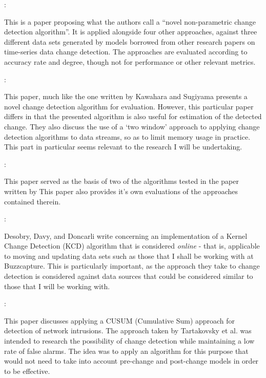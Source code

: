 \documentclass{uvamscse}
\begin{document}
\noindent\cite{kawahara2009change}: \textbf{}\smallskip

\noindent This is a paper proposing what the authors call a ``novel non-parametric change detection algorithm''\cite{kawahara2009change}. It is applied alongside four other approaches, against three different data sets generated by models borrowed from other research papers on time-series data change detection. The approaches are evaluated according to accuracy rate and degree, though not for performance or other relevant metrics.\bigskip

\noindent\cite{kifer2004detecting}: \textbf{}\smallskip

\noindent This paper, much like the one written by Kawahara and Sugiyama presents a novel change detection algorithm for evaluation. However, this particular paper differs in that the presented algorithm is also useful for estimation of the detected change. They also discuss the use of a `two window' approach to applying change detection algorithms to data streams, so as to limit memory usage in practice. This part in particular seems relevant to the research I will be undertaking.\bigskip

\noindent\cite{galeano2007covariance}: \textbf{}\smallskip

\noindent This paper served as the basis of two of the algorithms tested in the paper written by \citeauthor{BuntainChanges2014} This paper also provides it’s own evaluations of the approaches contained therein.\bigskip

\noindent\cite{desobry2005online}: \textbf{}\smallskip

\noindent Desobry, Davy, and Doncarli write concerning an implementation of a Kernel Change Detection (KCD) algorithm that is considered \textit{online} - that is, applicable to moving and updating data sets such as those that I shall be working with at Buzzcapture. This is particularly important, as the approach they take to change detection is considered against data sources that could be considered similar to those that I will be working with.\bigskip

\noindent\cite{tartakovsky2006detection}: \textbf{}\smallskip

\noindent This paper discusses applying a CUSUM (Cumulative Sum) approach for detection of network intrusions. The approach taken by Tartakovsky et al. was intended to research the possibility of change detection while maintaining a low rate of false alarms. The idea was to apply an algorithm for this purpose that would not need to take into account pre-change and post-change models in order to be effective.\bigskip
\end{document}
